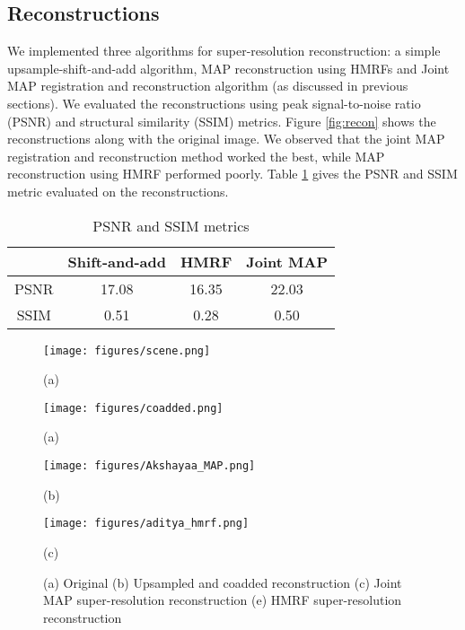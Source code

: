\documentclass[10pt,twocolumn,letterpaper]{article}
\begin{document}
\subsection{Reconstructions}
 We implemented three algorithms for super-resolution reconstruction: a simple upsample-shift-and-add algorithm, MAP reconstruction using HMRFs and Joint MAP registration and reconstruction algorithm (as discussed in previous sections). We evaluated the reconstructions using peak signal-to-noise ratio (PSNR) and structural similarity (SSIM) \cite{ssim} metrics. Figure \ref{fig:recon} shows the reconstructions along with the original image. We observed that the joint MAP registration and reconstruction method worked the best, while MAP reconstruction using HMRF performed poorly. Table \ref{tab:my_label} gives the PSNR and SSIM metric evaluated on the reconstructions.

\begin{table}[]
    \centering
    \begin{tabular}{|c|c|c|c|}
    \hline 
             & Shift-and-add & HMRF & Joint MAP\\
    \hline
        PSNR & 17.08            & 16.35 & 22.03 \\
        SSIM & 0.51             & 0.28 & 0.50  \\
        \hline
    \end{tabular}
    \caption{PSNR and SSIM metrics}
    \label{tab:my_label}
\end{table}




\begin{figure}[htb]\label{fig:recon}
\begin{minipage}[b]{0.24\linewidth}
  \centering
  \centerline{\texttt{[image: figures/scene.png]}}
  \centerline{(a)}\medskip
\end{minipage}
\hfill
\begin{minipage}[b]{0.24\linewidth}
  \centering
  \centerline{\texttt{[image: figures/coadded.png]}}
  \centerline{(a)}\medskip
\end{minipage}
\hfill
\begin{minipage}[b]{0.24\linewidth}
  \centering
  \centerline{\texttt{[image: figures/Akshayaa\_MAP.png]}}
  \centerline{(b)}\medskip
\end{minipage}
\hfill
\begin{minipage}[b]{0.24\linewidth}
  \centering
  \centerline{\texttt{[image: figures/aditya\_hmrf.png]}}
  \centerline{(c)}\medskip
\end{minipage}
\caption{(a) Original (b) Upsampled and coadded reconstruction (c) Joint MAP super-resolution reconstruction
 (e) HMRF super-resolution reconstruction}
\label{fig:diff_lens}
%
\end{figure}
\end{document}
